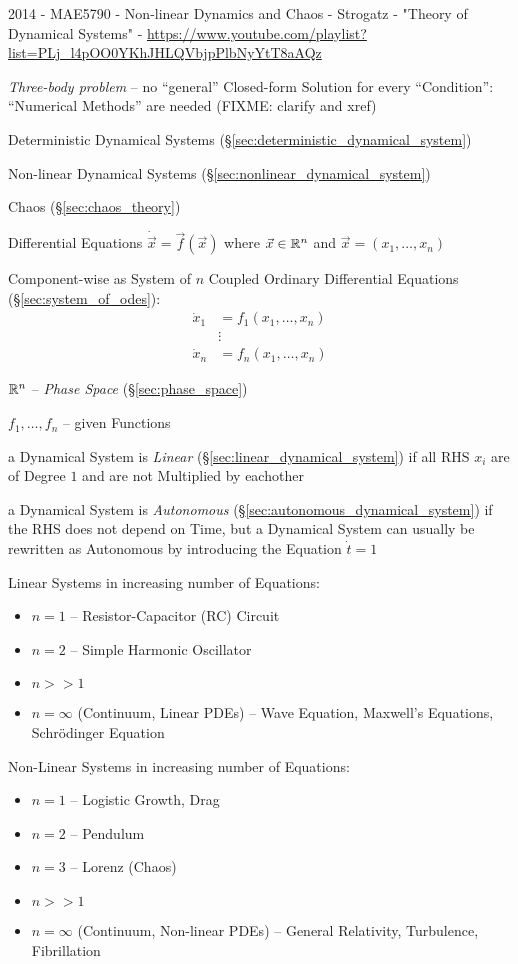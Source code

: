 \asterism

2014 - MAE5790 - Non-linear Dynamics and Chaos - Strogatz - "Theory of
Dynamical Systems" -
\url{https://www.youtube.com/playlist?list=PLj_l4pOO0YKhJHLQVbjpPlbNyYtT8aAQz}

\emph{Three-body problem} -- no ``general'' Closed-form Solution for every
``Condition'': ``Numerical Methods'' are needed
(FIXME: clarify and xref)

Deterministic Dynamical Systems (\S\ref{sec:deterministic_dynamical_system})

Non-linear Dynamical Systems (\S\ref{sec:nonlinear_dynamical_system})

Chaos (\S\ref{sec:chaos_theory})

Differential Equations $\dot{\vec{x}} = \vec{f}(\vec{x})$ where
$\vec{x} \in \mathbb{R}^n$ and $\vec{x} = (x_1,\ldots,x_n)$

Component-wise as System of $n$ Coupled Ordinary Differential Equations
(\S\ref{sec:system_of_odes}):
\begin{align*}
  \dot{x}_1 & = f_1(x_1,\ldots,x_n) \\
            & \vdots \\
  \dot{x}_n & = f_n(x_1,\ldots,x_n)
\end{align*}

$\mathbb{R}^n$ -- \emph{Phase Space} (\S\ref{sec:phase_space})

$f_1, \ldots, f_n$ -- given Functions

a Dynamical System is \emph{Linear} (\S\ref{sec:linear_dynamical_system}) if
all RHS $x_i$ are of Degree $1$ and are not Multiplied by eachother

a Dynamical System is \emph{Autonomous}
(\S\ref{sec:autonomous_dynamical_system}) if the RHS does not depend on Time,
but a Dynamical System can usually be rewritten as Autonomous by introducing
the Equation $\dot{t} = 1$

Linear Systems in increasing number of Equations:
\begin{itemize}
  \item $n = 1$ -- Resistor-Capacitor (RC) Circuit
  \item $n = 2$ -- Simple Harmonic Oscillator
  \item $n >> 1$
  \item $n = \infty$ (Continuum, Linear PDEs) -- Wave Equation, Maxwell's
    Equations, Schr\"odinger Equation
\end{itemize}

Non-Linear Systems in increasing number of Equations:
\begin{itemize}
  \item $n = 1$ -- Logistic Growth, Drag
  \item $n = 2$ -- Pendulum
  \item $n = 3$ -- Lorenz (Chaos)
  \item $n >> 1$
  \item $n = \infty$ (Continuum, Non-linear PDEs) -- General Relativity,
    Turbulence, Fibrillation
\end{itemize}

